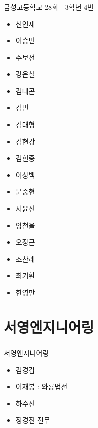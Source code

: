 \documentclass[aspectratio=1610,20pt,xcolor=pdftex,dvipsnames,table,handout]{beamer}
\begin{document}
		\begin{frame} [t,plain]
		\frametitle{ }
			\begin{block} {금성고등학교 28회 - 3학년 4반}
			\setlength{\leftmargini}{2em}			
			\begin{itemize}
				\item 신인재	\hrulefill 	
				\item 이승민	\hrulefill 	
				\item 주보선	\hrulefill 	
				\item 강은철	\hrulefill 	
				\item 김대곤	\hrulefill 	
				\item 김면	\hrulefill 	
				\item 김태형	\hrulefill 	
				\item 김현강	\hrulefill 	
				\item 김현중	\hrulefill 	
				\item 이상백	\hrulefill 	
				\item 문중현	\hrulefill 	
				\item 서윤진	\hrulefill 	
				\item 양천을	\hrulefill 	
				\item 오장근	\hrulefill 	
				\item 조찬래	\hrulefill 	
				\item 최기환	\hrulefill 	
				\item 한영만	\hrulefill 	
			\end{itemize}
			\end{block}						
	
		\end{frame}						

		\section{서영엔지니어링 }
		\begin{frame} [t,plain]
		\frametitle{ }
			\begin{block} {서영엔지니어링 }
			\setlength{\leftmargini}{2em}			
			\begin{itemize}
				\item 김경갑
				\item 이재봉 : 와룡법전
				\item 하수진
				\item 정경진 전무


			\end{itemize}
			\end{block}						
		\end{frame}						
\end{document}
